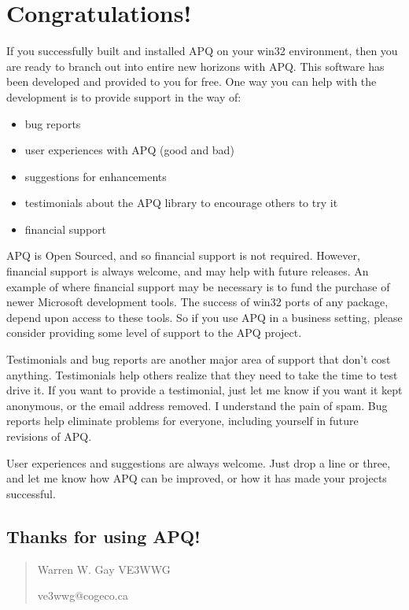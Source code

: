 \documentclass[english]{report}
\newenvironment{lyxcode}
   {\begin{list}{}{
     \setlength{\rightmargin}{\leftmargin}
     \setlength{\listparindent}{0pt}%
     \raggedright
     \setlength{\itemsep}{0pt}
     \setlength{\parsep}{0pt}
     \normalfont\ttfamily}%
    \item[]}
   {\end{list}}
\begin{document}
\section{Congratulations!}

If you successfully built and installed APQ on your win32 environment,
then you are ready to branch out into entire new horizons with APQ.
This software has been developed and provided to you for free. One
way you can help with the development is to provide support in the
way of:

\begin{itemize}
\item bug reports
\item user experiences with APQ (good and bad)
\item suggestions for enhancements
\item testimonials about the APQ library to encourage others to try it
\item financial support
\end{itemize}
APQ is Open Sourced, and so financial support is not required. However,
financial support is always welcome, and may help with future releases.
An example of where financial support may be necessary is to fund
the purchase of newer Microsoft development tools. The success of
win32 ports of any package, depend upon access to these tools. So
if you use APQ in a business setting, please consider providing some
level of support to the APQ project.

Testimonials and bug reports are another major area of support that
don't cost anything. Testimonials help others realize that they need
to take the time to test drive it. If you want to provide a testimonial,
just let me know if you want it kept anonymous, or the email address
removed. I understand the pain of spam. Bug reports help eliminate
problems for everyone, including yourself in future revisions of APQ. 

User experiences and suggestions are always welcome. Just drop a line
or three, and let me know how APQ can be improved, or how it has made
your projects successful.


\subsection*{Thanks for using APQ!}

\begin{quote}
Warren W. Gay VE3WWG

ve3wwg@cogeco.ca
\end{quote}
\begin{lyxcode}
\end{lyxcode}
\end{document}
